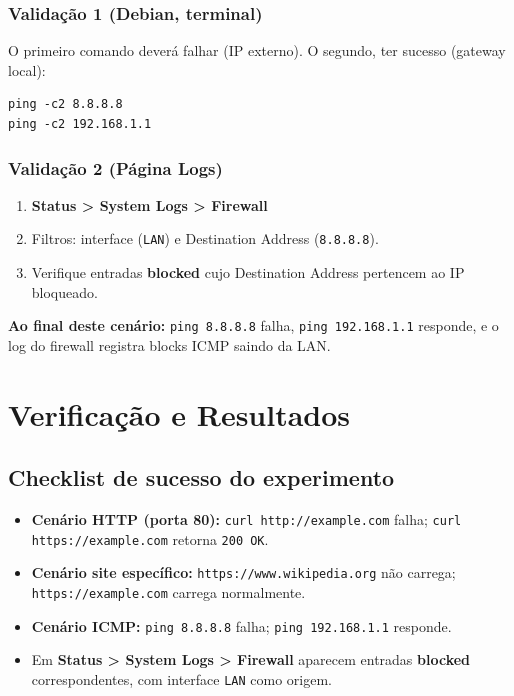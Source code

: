 

\subsubsection*{Validação 1 (Debian, terminal)}

O primeiro comando deverá falhar (IP externo). O segundo, ter sucesso (gateway local):
\begin{lstlisting}
ping -c2 8.8.8.8
ping -c2 192.168.1.1
\end{lstlisting}


\subsubsection*{Validação 2 (Página Logs)}

\begin{enumerate}
\item \textbf{Status > System Logs > Firewall}
\item Filtros: interface (\texttt{LAN}) e Destination Address (\texttt{8.8.8.8}).
\item Verifique entradas \textbf{blocked} cujo Destination Address pertencem ao IP bloqueado.
\end{enumerate}


\begin{notebox}
\textbf{Ao final deste cenário:} \texttt{ping 8.8.8.8} falha, \texttt{ping 192.168.1.1} responde, e o log do firewall registra blocks ICMP saindo da LAN.
\end{notebox}

\section{Verificação e Resultados}

\subsection{Checklist de sucesso do experimento}

\begin{itemize}
  \item \textbf{Cenário HTTP (porta 80):} \texttt{curl http://example.com} falha; \texttt{curl https://example.com} retorna \texttt{200 OK}.
  \item \textbf{Cenário site específico:} \texttt{https://www.wikipedia.org} não carrega; \texttt{https://example.com} carrega normalmente.
  \item \textbf{Cenário ICMP:} \texttt{ping 8.8.8.8} falha; \texttt{ping 192.168.1.1} responde.
  \item Em \textbf{Status > System Logs > Firewall} aparecem entradas \textbf{blocked} correspondentes, com interface \texttt{LAN} como origem.
\end{itemize}

